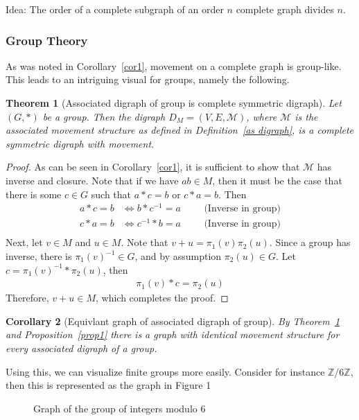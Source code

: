 \documentclass[a4paper,11pt]{article}
\theoremstyle{plain}
\newtheorem{theorem}{Theorem}
\newtheorem{corollary}[theorem]{Corollary}
\theoremstyle{definition}
\newcommand{\Z}{\mathbb{Z}}
\newcommand{\iff}{\Longleftrightarrow}
\begin{document}
Idea: The order of a complete subgraph of an order $n$ complete graph divides $n$.
\subsubsection{Group Theory}
As was noted in Corollary~\ref{cor1}, movement on a complete graph is
group-like. This leads to an intriguing visual for groups, namely the
following.
\begin{theorem}[Associated digraph of group is 
	complete symmetric digraph]\label{the2}
	Let $(G,*)$ be a group. Then the digraph $D_M=(V,E,\mathcal{M})$,
	where $\mathcal{M}$ is the associated movement structure as
	defined in Definition~\ref{as digraph}, is a complete symmetric
	digraph with movement.
\end{theorem}
\begin{proof}
	As can be seen in Corollary~\ref{cor1}, it is sufficient to show that
	$\mathcal{M}$ has inverse and closure. Note that if we have $ab\in M$, then
	it must be the case that there is some $c\in G$ such that $a*c=b$ or
	$c*a=b$. Then
	\begin{equation}
	\begin{aligned}
		a*c=b &\iff b*c^{-1}=a &&&\text{(Inverse in group)}\\
		c*a=b &\iff c^{-1}*b=a &&&\text{(Inverse in group)}\\
	\end{aligned}
	\end{equation}
	Next, let $v\in M$ and $u\in M$. Note that $v+u=\pi_1(v)\pi_2(u)$. Since a
	group has inverse, there is ${\pi_1(v)}^{-1} \in G$, and by assumption
	$\pi_2(u)\in G$. Let $c={\pi_1(v)}^{-1}*\pi_2(u)$, then
	\begin{equation}
	\begin{aligned}
		\pi_1(v)*c=\pi_2(u)
	\end{aligned}
	\end{equation}
	Therefore, $v+u\in M$, which completes the proof.
\end{proof}
\begin{corollary}[Equivlant graph of associated digraph of group]
	By Theorem~\ref{the2} and Proposition~\ref{prop1} there is a graph with
	identical movement structure for every associated digraph of a group.
\end{corollary}
Using this, we can visualize finite groups more easily. Consider for instance
$\Z/6\Z$, then this is represented as the graph in Figure 1

\begin{figure}[h]\label{fig:ZmodN}
	\centering
	\caption{Graph of the group of integers modulo 6}
\end{figure}
\end{document}
